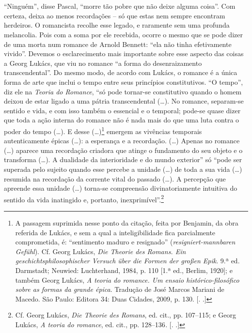 \section{}

``Ninguém'', disse Pascal, ``morre tão pobre que não deixe alguma
coisa''. Com certeza, deixa ao menos recordações -- só que estas nem
sempre encontram herdeiros. O romancista recolhe esse legado, e
raramente sem uma profunda melancolia. Pois com a soma por ele recebida,
ocorre o mesmo que se pode dizer de uma morta num romance de Arnold
Bennett: ``ela não tinha efetivamente vivido''. Devemos o esclarecimento
mais importante sobre esse aspecto das coisas a Georg Lukács, que viu no
romance ``a forma do desenraizamento transcendental''. Do mesmo modo, de
acordo com Lukács, o romance é a única forma de arte que inclui o tempo
entre seus princípios constitutivos. ``O tempo'', diz ele na
\emph{Teoria do Romance}, ``só pode tornar-se constitutivo quando o
homem deixou de estar ligado a uma pátria transcendental (\ldots{}). No
romance, separam-se sentido e vida, e com isso também o essencial e o
temporal; pode-se quase dizer que toda a ação interna do romance não é
nada mais do que uma luta contra o poder do tempo (\ldots{}). E desse
(\ldots{})\footnote{A passagem suprimida nesse ponto da citação, feita por
  Benjamin, da obra referida de Lukács, e sem a qual a inteligibilidade
  fica parcialmente comprometida, é: ``sentimento maduro e resignado''
  (\emph{resigniert-mannbaren Gefühl}). Cf. Georg Lukács, \emph{Die
  Theorie des Romans. Ein geschichtsphilosophischer Versuch über die
  Formen der großen Epik}. 9.ª ed. Darmstadt; Neuwied: Luchterhand,
  1984, p. 110 [1.ª ed., Berlim, 1920]; e também Georg Lukács,
  \emph{A teoria do romance. Um ensaio histórico-filosófico sobre as
  formas da grande épica}. Tradução de José Marcos Mariani de Macedo.
  São Paulo: Editora 34: Duas Cidades, 2009, p. 130. [. .]}
emergem as vivências temporais autenticamente épicas (\ldots{}): a
esperança e a recordação. (\ldots{}) Apenas no romance (\ldots{}) aparece uma
recordação criadora que atinge o fundamento do seu objeto e o transforma
(\ldots{}). A dualidade da interioridade e do mundo exterior'' só ``pode ser
superada pelo sujeito quando esse percebe a unidade (\ldots{}) de toda a sua
vida (\ldots{}) resumida na recordação da corrente vital do passado (\ldots{}). A
percepção que apreende essa unidade (\ldots{}) torna-se compreensão
divinatoriamente intuitiva do sentido da vida inatingido e, portanto,
inexprimível''.\footnote{Cf. Georg Lukács, \emph{Die Theorie des
  Romans}, ed. cit., pp. 107--115; e Georg Lukács, \emph{A teoria do
  romance}, ed. cit., pp. 128--136\emph{.} [. .]}

